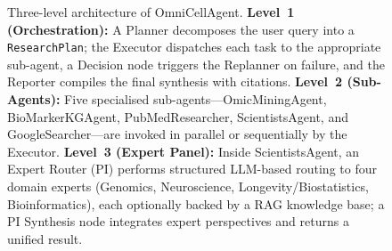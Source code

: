 \begin{figure}[ht]
{%
}%
\caption{Three-level architecture of OmniCellAgent. 
\textbf{Level~1 (Orchestration):} A Planner decomposes the user query into a 
\texttt{ResearchPlan}; the Executor dispatches each task to the appropriate 
sub-agent, a Decision node triggers the Replanner on failure, and the Reporter 
compiles the final synthesis with citations. 
\textbf{Level~2 (Sub-Agents):} Five specialised sub-agents—OmicMiningAgent, 
BioMarkerKGAgent, PubMedResearcher, ScientistsAgent, and GoogleSearcher—are 
invoked in parallel or sequentially by the Executor. 
\textbf{Level~3 (Expert Panel):} Inside ScientistsAgent, an Expert Router (PI) 
performs structured LLM-based routing to four domain experts (Genomics, 
Neuroscience, Longevity/Biostatistics, Bioinformatics), each optionally backed 
by a RAG knowledge base; a PI Synthesis node integrates expert perspectives 
and returns a unified result.}
\label{fig:architecture}
\end{figure}
